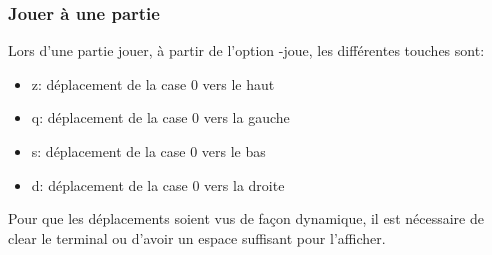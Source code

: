 \documentclass{beamer}
\begin{document}
  
  \begin{frame}
   \frametitle{Jouer à une partie}
	Lors d'une partie jouer, à partir de l'option -joue, les différentes touches sont:
	\begin{itemize}
	\item z: déplacement de la case 0 vers le haut
	\item q: déplacement de la case 0 vers la gauche
	\item s: déplacement de la case 0 vers le bas
	\item d: déplacement de la case 0 vers la droite
	\end{itemize}
	Pour que les déplacements soient vus de façon dynamique, il est nécessaire de clear le terminal ou d'avoir un espace suffisant pour l'afficher.
	\end{frame}
\end{document}
